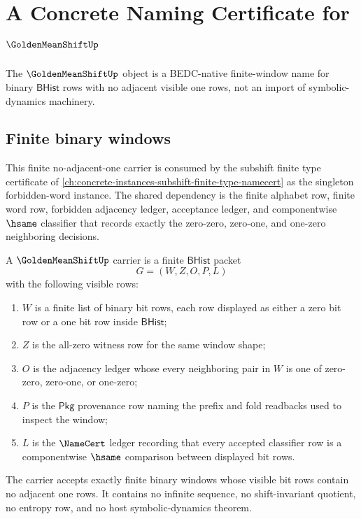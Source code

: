 \chapter{A Concrete Naming Certificate for $\GoldenMeanShiftUp$}
\label{ch:concrete-instances-golden-mean-shift-namecert}

The $\GoldenMeanShiftUp$ object is a BEDC-native finite-window name for binary $\mathsf{BHist}$ rows with no adjacent visible one rows, not an import of symbolic-dynamics machinery.

\section{Finite binary windows}
\label{sec:golden-mean-shift-finite-binary-windows}

This finite no-adjacent-one carrier is consumed by the subshift finite type certificate of \autoref{ch:concrete-instances-subshift-finite-type-namecert} as the singleton forbidden-word instance. The shared dependency is the finite alphabet row, finite word row, forbidden adjacency ledger, acceptance ledger, and componentwise $\hsame$ classifier that records exactly the zero-zero, zero-one, and one-zero neighboring decisions.

\begin{definition}
\label{def:golden-mean-shift-carrier}
A $\GoldenMeanShiftUp$ carrier is a finite $\mathsf{BHist}$ packet
$$
G=(W,Z,O,P,L)
$$
with the following visible rows:
\begin{enumerate}
\item $W$ is a finite list of binary bit rows, each row displayed as either a zero bit row or a one bit row inside $\mathsf{BHist}$;
\item $Z$ is the all-zero witness row for the same window shape;
\item $O$ is the adjacency ledger whose every neighboring pair in $W$ is one of zero-zero, zero-one, or one-zero;
\item $P$ is the $\mathsf{Pkg}$ provenance row naming the prefix and fold readbacks used to inspect the window;
\item $L$ is the $\NameCert$ ledger recording that every accepted classifier row is a componentwise $\hsame$ comparison between displayed bit rows.
\end{enumerate}
The carrier accepts exactly finite binary windows whose visible bit rows contain no adjacent one rows. It contains no infinite sequence, no shift-invariant quotient, no entropy row, and no host symbolic-dynamics theorem.
\end{definition}

